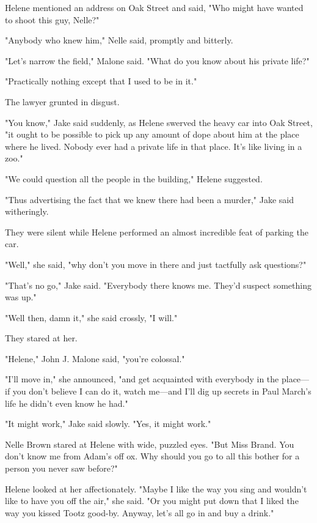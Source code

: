 \documentclass{novel}
\begin{document}
Helene mentioned an address on Oak Street and said, "Who might have wanted to shoot this guy, Nelle?"

"Anybody who knew him," Nelle said, promptly and bitterly.

"Let’s narrow the field," Malone said. "What do you know about his private life?"

"Practically nothing except that I used to be in it."

The lawyer grunted in disgust.

"You know," Jake said suddenly, as Helene swerved the heavy car into Oak Street, "it ought to be possible to pick up any amount of dope about him at the place where he lived. Nobody ever had a private life in that place. It’s like living in a zoo."

"We could question all the people in the building," Helene suggested.

"Thus advertising the fact that we knew there had been a murder," Jake said witheringly.

They were silent while Helene performed an almost incredible feat of parking the car.

"Well," she said, "why don’t you move in there and just tactfully ask questions?"

"That’s no go," Jake said. "Everybody there knows me. They’d suspect something was up."

"Well then, damn it," she said crossly, "I will."

They stared at her.

"Helene," John J. Malone said, "you’re colossal."

"I'll move in," she announced, "and get acquainted with everybody in the place—if you don’t believe I can do it, watch me—and I'll dig up secrets in Paul March’s life he didn’t even know he had."

"It might work," Jake said slowly. "Yes, it might work."

Nelle Brown stared at Helene with wide, puzzled eyes. "But Miss Brand. You don’t know me from Adam’s off ox. Why should you go to all this bother for a person you never saw before?"

Helene looked at her affectionately. "Maybe I like the way you sing and wouldn’t like to have you off the air," she said. "Or you might put down that I liked the way you kissed Tootz good-by. Anyway, let’s all go in and buy a drink."

\vspace{2\nbs}
\clearpage
\thispagestyle{empty}
\end{document}
